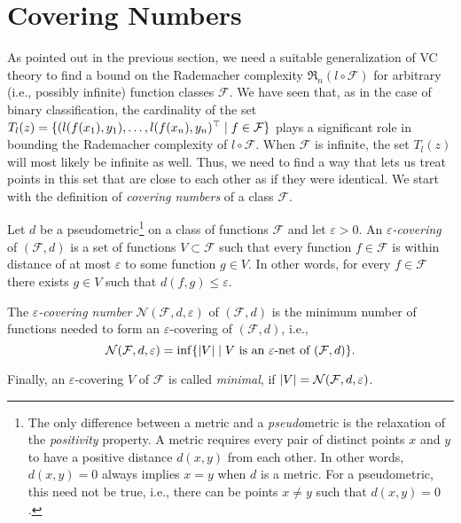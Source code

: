 \section{Covering Numbers}

As pointed out in the previous section, we need a suitable generalization of VC theory to find a bound on the Rademacher complexity $\mathfrak{R}_n(l \circ \mathcal{F})$ for arbitrary (i.e., possibly infinite) function classes $\mathcal{F}$. We have seen that, as in the case of binary classification, the cardinality of the set $T_l(z) = \{(l(f(x_1), y_1), \dots, l(f(x_n), y_n)^{\top} \mathrel{|} f \in \mathcal{F}\}$ plays a significant role in bounding the Rademacher complexity of $l \circ \mathcal{F}$. When $\mathcal{F}$ is infinite, the set $T_l(z)$ will  most likely be infinite as well. Thus, we need to find a way that lets us treat points in this set that are close to each other as if they were identical. We start with the definition of \emph{covering numbers} of a class $\mathcal{F}$.

\begin{definition}
Let $d$ be a pseudometric\footnote{The only difference between a metric and a \emph{pseudo}metric is the relaxation of the \emph{positivity} property. A metric requires every pair of distinct points $x$ and $y$ to have a positive distance $d(x, y)$ from each other. In other words, $d(x, y) = 0$ always implies $x = y$ when $d$ is a metric. For a pseudometric, this need not be true, i.e., there can be points $x \neq y$ such that $d(x, y) = 0$.} on a class of functions $\mathcal{F}$ and let $\varepsilon > 0$. An \emph{$\varepsilon$-covering} of $(\mathcal{F}, d)$ is a set of functions $V \subset \mathcal{F}$ such that every function $f \in \mathcal{F}$ is within distance of at most $\varepsilon$ to some function $g \in V$. In other words, for every $f \in \mathcal{F}$ there exists $g \in V$ such that $d(f, g) \leq \varepsilon$.

The \emph{$\varepsilon$-covering number} $\mathcal{N}(\mathcal{F}, d, \varepsilon)$ of $(\mathcal{F}, d)$ is the minimum number of functions needed to form an $\varepsilon$-covering of $(\mathcal{F}, d)$, i.e.,
\[
    \mathcal{N}(\mathcal{F}, d, \varepsilon) = \inf\set{\abs{V} \with V \text{ is an } \varepsilon \text{-net of } (\mathcal{F}, d)}.
\]

Finally, an $\varepsilon$-covering $V$ of $\mathcal{F}$ is called \emph{minimal}, if $\abs{V} = \mathcal{N}(\mathcal{F}, d, \varepsilon)$.
\end{definition}

